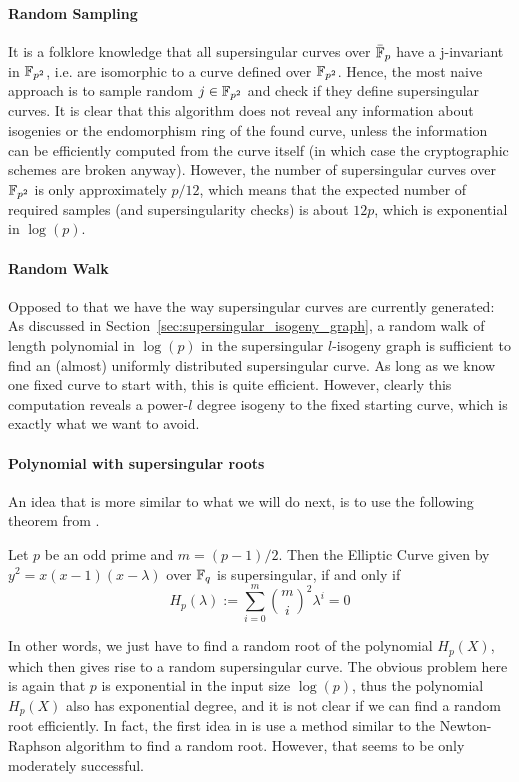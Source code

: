 \paragraph{Random Sampling} It is a folklore knowledge that all supersingular curves over $\bar{\mathbb{F}}_p$ have a j-invariant in $\mathbb{F}_{p^2}$, i.e. are isomorphic to a curve defined over $\mathbb{F}_{p^2}$.
Hence, the most naive approach is to sample random $j \in \mathbb{F}_{p^2}$ and check if they define supersingular curves.
It is clear that this algorithm does not reveal any information about isogenies or the endomorphism ring of the found curve, unless the information can be efficiently computed from the curve itself (in which case the cryptographic schemes are broken anyway).
However, the number of supersingular curves over $\mathbb{F}_{p^2}$ is only approximately $p/12$, which means that the expected number of required samples (and supersingularity checks) is about $12p$, which is exponential in $\log(p)$.

\paragraph{Random Walk} Opposed to that we have the way supersingular curves are currently generated:
As discussed in Section~\ref{sec:supersingular_isogeny_graph}, a random walk of length polynomial in $\log(p)$ in the supersingular $l$-isogeny graph is sufficient to find an (almost) uniformly distributed supersingular curve.
As long as we know one fixed curve to start with, this is quite efficient.
However, clearly this computation reveals a power-$l$ degree isogeny to the fixed starting curve, which is exactly what we want to avoid.

\paragraph{Polynomial with supersingular roots} An idea that is more similar to what we will do next, is to use the following theorem from \cite[Thm~V.4.1]{arithmetic_elliptic_curves}.
\begin{theorem}
    Let $p$ be an odd prime and $m = (p - 1)/2$. Then the Elliptic Curve given by $y^2 = x(x - 1)(x - \lambda)$ over $\mathbb{F}_q$ is supersingular, if and only if
    \begin{equation*}
        H_p(\lambda) := \sum_{i = 0}^m {m \choose i}^2 \lambda^i = 0
    \end{equation*}
\end{theorem}
In other words, we just have to find a random root of the polynomial $H_p(X)$, which then gives rise to a random supersingular curve.
The obvious problem here is again that $p$ is exponential in the input size $\log(p)$, thus the polynomial $H_p(X)$ also has exponential degree, and it is not clear if we can find a random root efficiently.
In fact, the first idea in \cite{base_paper} is use a method similar to the Newton-Raphson algorithm to find a random root.
However, that seems to be only moderately successful.

